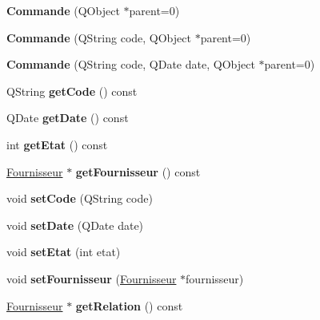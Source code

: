 \begin{DoxyCompactItemize}
\item 
\hypertarget{class_commande_ad68950904e104bde06bf10569871873f}{
{\bfseries Commande} (QObject $\ast$parent=0)}
\label{class_commande_ad68950904e104bde06bf10569871873f}

\item 
\hypertarget{class_commande_a6a041d58081e667a7894c0be35f09792}{
{\bfseries Commande} (QString code, QObject $\ast$parent=0)}
\label{class_commande_a6a041d58081e667a7894c0be35f09792}

\item 
\hypertarget{class_commande_a9133e616904f1de107284a92d0dcd1ec}{
{\bfseries Commande} (QString code, QDate date, QObject $\ast$parent=0)}
\label{class_commande_a9133e616904f1de107284a92d0dcd1ec}

\item 
\hypertarget{class_commande_a15435c7ea66fb31a2a688ccb42db1532}{
QString {\bfseries getCode} () const }
\label{class_commande_a15435c7ea66fb31a2a688ccb42db1532}

\item 
\hypertarget{class_commande_ab637d39c6cd62a8c35ab4d935b3e8be8}{
QDate {\bfseries getDate} () const }
\label{class_commande_ab637d39c6cd62a8c35ab4d935b3e8be8}

\item 
\hypertarget{class_commande_aa71c200197a231744d161b01d4c4cd73}{
int {\bfseries getEtat} () const }
\label{class_commande_aa71c200197a231744d161b01d4c4cd73}

\item 
\hypertarget{class_commande_a22acedca2cfbfe5ac3350d119345bba9}{
\hyperlink{class_fournisseur}{Fournisseur} $\ast$ {\bfseries getFournisseur} () const }
\label{class_commande_a22acedca2cfbfe5ac3350d119345bba9}

\item 
\hypertarget{class_commande_a154042e09feeb5fc11d2dae893481e73}{
void {\bfseries setCode} (QString code)}
\label{class_commande_a154042e09feeb5fc11d2dae893481e73}

\item 
\hypertarget{class_commande_a0b3188df4367fd7366e82415c8b1f8c1}{
void {\bfseries setDate} (QDate date)}
\label{class_commande_a0b3188df4367fd7366e82415c8b1f8c1}

\item 
\hypertarget{class_commande_ab6f80b3c1977fff775a8e56bc7dc700f}{
void {\bfseries setEtat} (int etat)}
\label{class_commande_ab6f80b3c1977fff775a8e56bc7dc700f}

\item 
\hypertarget{class_commande_a215f27c225512c97b273102a04692493}{
void {\bfseries setFournisseur} (\hyperlink{class_fournisseur}{Fournisseur} $\ast$fournisseur)}
\label{class_commande_a215f27c225512c97b273102a04692493}

\item 
\hypertarget{class_commande_a1a3e9d88a79e02a7e147a142d0775b06}{
\hyperlink{class_fournisseur}{Fournisseur} $\ast$ {\bfseries getRelation} () const }
\label{class_commande_a1a3e9d88a79e02a7e147a142d0775b06}

\end{DoxyCompactItemize}
